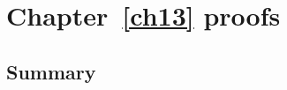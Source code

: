 \chapter{Chapter~\ref{ch13} proofs}

\newpage
\section{Summary}\label{ch13.ps.summary}
\lpscriptsummary
